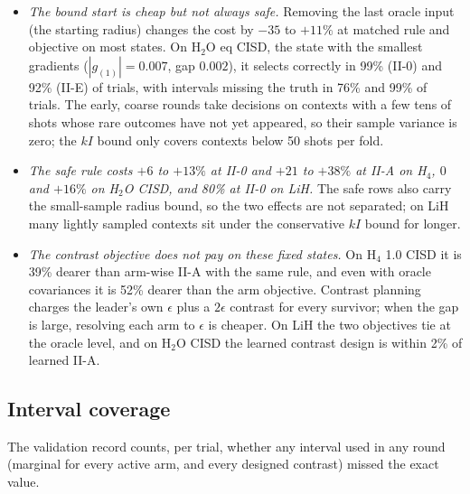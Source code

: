 \documentclass[10.5pt]{article}
\begin{document}
\begin{itemize}
  \item \emph{The bound start is cheap but not always safe.} Removing the last oracle input (the starting radius) changes the cost by $-35$ to $+11\%$ at matched rule and objective on most states. On H$_2$O eq CISD, the state with the smallest gradients ($|g_{(1)}|=0.007$, gap $0.002$), it selects correctly in 99\% (II-0) and 92\% (II-E) of trials, with intervals missing the truth in 76\% and 99\% of trials. The early, coarse rounds take decisions on contexts with a few tens of shots whose rare outcomes have not yet appeared, so their sample variance is zero; the $kI$ bound only covers contexts below 50 shots per fold.
  \item \emph{The safe rule costs $+6$ to $+13\%$ at II-0 and $+21$ to $+38\%$ at II-A on H$_4$, $0$ and $+16\%$ on H$_2$O CISD, and 80\% at II-0 on LiH.} The safe rows also carry the small-sample radius bound, so the two effects are not separated; on LiH many lightly sampled contexts sit under the conservative $kI$ bound for longer.
  \item \emph{The contrast objective does not pay on these fixed states.} On H$_4$ 1.0 CISD it is 39\% dearer than arm-wise II-A with the same rule, and even with oracle covariances it is 52\% dearer than the arm objective. Contrast planning charges the leader's own $\epsilon$ plus a $2\epsilon$ contrast for every survivor; when the gap is large, resolving each arm to $\epsilon$ is cheaper. On LiH the two objectives tie at the oracle level, and on H$_2$O CISD the learned contrast design is within 2\% of learned II-A.
\end{itemize}

\subsection{Interval coverage}
\label{sec:coverage}

The validation record counts, per trial, whether any interval used in any round (marginal for every active arm, and every designed contrast) missed the exact value.
\end{document}
